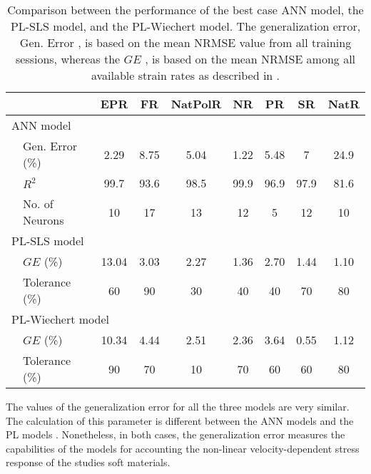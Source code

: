 \begin{table}[htb!]
	\centering
	\caption{Comparison between the performance of the best case ANN model, the PL-SLS model, and the PL-Wiechert model. The generalization error, Gen. Error , is based on the mean NRMSE value from all training sessions, whereas the $GE$ , is based on the mean NRMSE among all available strain rates as described in .}
	\begin{tabular}{p{1em} l ccccccc}
		\toprule
		&                   				& EPR   & FR    & NatPolR	& NR  & PR    & SR    & NatR\\
		\hline
		\multicolumn{9}{l}{ANN model}\\
			&Gen. Error (\%)          			& 2.29  & 8.75  & 5.04		& 1.22  & 5.48  & 7     &   24.9\\
		&$R^2$             					& 99.7 	& 93.6	& 98.5		& 99.9	& 96.9	& 97.9	&   81.6\\	
		&No. of Neurons                     & 10    & 17    & 13	   	& 12    & 5     & 12    &   10\\
		
		\hline
		\multicolumn{9}{l}{PL-SLS model}\\
		&$GE$ (\%)          				& 13.04	& 3.03  & 2.27		& 1.36  & 2.70  & 1.44	& 1.10\\
		&Tolerance (\%)                 	& 60  	& 90    & 30    	& 40    & 40    & 70    & 80\\
		\hline
		\multicolumn{9}{l}{PL-Wiechert model}\\
		&$GE$ (\%)          & 10.34    & 4.44  & 2.51   & 2.36  & 3.64  & 0.55   & 1.12\\
		&Tolerance (\%)                 & 90    & 70    & 10    & 70    & 60    & 60    & 80\\		
		\bottomrule
	\end{tabular}
	\label{tbl:ANNvsSLS}
\end{table}

The values of the generalization error for all the three models are very similar. The calculation of this parameter is different between the ANN models  and the PL models . Nonetheless, in both cases, the generalization error measures the capabilities of the models for accounting the non-linear velocity-dependent stress response of the studies soft materials.

